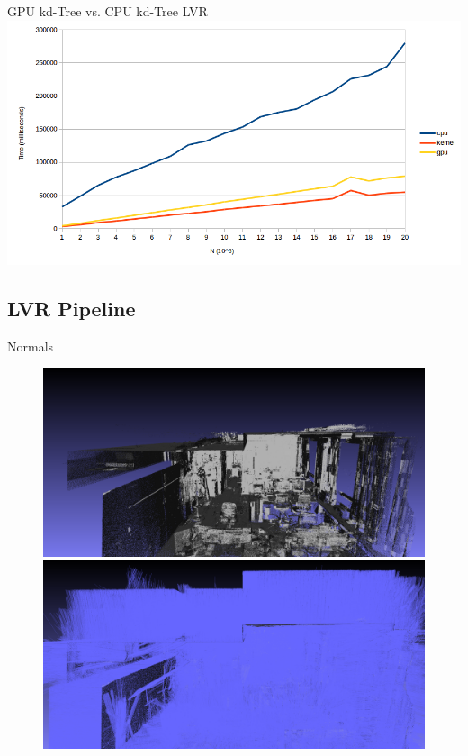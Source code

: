 \documentclass{beamer}
\begin{document}
\begin{frame}{GPU kd-Tree vs. CPU kd-Tree LVR}
	\includegraphics[width=1.0\textwidth]{cpu_gpu_results.png}
\end{frame}

\subsection*{LVR Pipeline}

\begin{frame}{Normals}
 	\begin{figure}
  		\centering
  		\includegraphics[height=0.39\textheight]{police_no_normals.png}\\
  		\vspace{0.1cm}
  		\includegraphics[height=0.39\textheight]{police_normals.png}
	\end{figure}
\end{frame}
\end{document}
